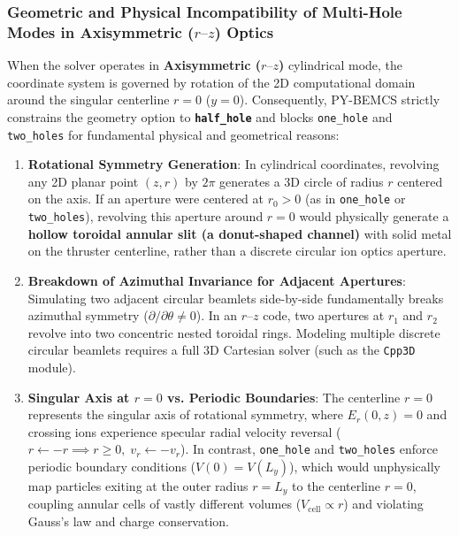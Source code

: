 \documentclass[11pt,a4paper]{article}
\newcommand{\PYBEMCS}{PY-BEMCS}
\begin{document}
\subsubsection{Geometric and Physical Incompatibility of Multi-Hole Modes in Axisymmetric ($r\text{--}z$) Optics}
When the solver operates in \textbf{Axisymmetric ($r\text{--}z$)} cylindrical mode, the coordinate system is governed by rotation of the 2D computational domain around the singular centerline $r = 0$ ($y = 0$). Consequently, \PYBEMCS{} strictly constrains the geometry option to \textbf{\texttt{half\_hole}} and blocks \texttt{one\_hole} and \texttt{two\_holes} for fundamental physical and geometrical reasons:
\begin{enumerate}[nosep]
    \item \textbf{Rotational Symmetry Generation}: In cylindrical coordinates, revolving any 2D planar point $(z, r)$ by $2\pi$ generates a 3D circle of radius $r$ centered on the axis. If an aperture were centered at $r_0 > 0$ (as in \texttt{one\_hole} or \texttt{two\_holes}), revolving this aperture around $r = 0$ would physically generate a \textbf{hollow toroidal annular slit (a donut-shaped channel)} with solid metal on the thruster centerline, rather than a discrete circular ion optics aperture.
    \item \textbf{Breakdown of Azimuthal Invariance for Adjacent Apertures}: Simulating two adjacent circular beamlets side-by-side fundamentally breaks azimuthal symmetry ($\partial / \partial \theta \ne 0$). In an $r\text{--}z$ code, two apertures at $r_1$ and $r_2$ revolve into two concentric nested toroidal rings. Modeling multiple discrete circular beamlets requires a full 3D Cartesian solver (such as the \texttt{Cpp3D} module).
    \item \textbf{Singular Axis at $r = 0$ vs. Periodic Boundaries}: The centerline $r = 0$ represents the singular axis of rotational symmetry, where $E_r(0, z) = 0$ and crossing ions experience specular radial velocity reversal ($r \leftarrow -r \implies r \ge 0,\; v_r \leftarrow -v_r$). In contrast, \texttt{one\_hole} and \texttt{two\_holes} enforce periodic boundary conditions ($V(0) = V(L_y)$), which would unphysically map particles exiting at the outer radius $r = L_y$ to the centerline $r = 0$, coupling annular cells of vastly different volumes ($V_{\mathrm{cell}} \propto r$) and violating Gauss's law and charge conservation.
\end{enumerate}

\end{document}
